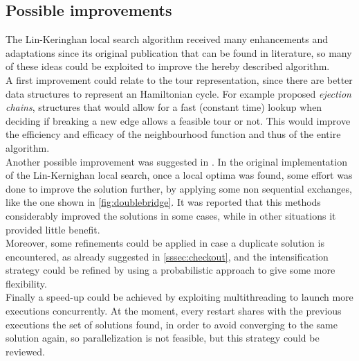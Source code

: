 \subsection{Possible improvements}
The Lin-Keringhan local search algorithm received many enhancements and adaptations since its original publication that can be found in literature, so many of these ideas could be exploited to improve the hereby described algorithm.\\
A first improvement could relate to the tour representation, since there are better data structures to represent an Hamiltonian cycle. For example \cite{GLOVER1996223} proposed \textit{ejection chains}, structures that would allow for a fast (constant time) lookup when deciding if breaking a new edge allows a feasible tour or not. This would improve the efficiency and efficacy of the neighbourhood function and thus of the entire algorithm. \\
Another possible improvement was suggested in \cite{LinK73}. In the original implementation of the Lin-Kernighan local search, once a local optima was found, some effort was done to improve the solution further, by applying some non sequential exchanges, like the one shown in \cref{fig:doublebridge}. It was reported that this methods considerably improved the solutions in some cases, while in other situations it provided little benefit.\\
Moreover, some refinements could be applied in case a duplicate solution is encountered, as already suggested in \cref{sssec:checkout}, and the intensification strategy could be refined by using a probabilistic approach to give some more flexibility.\\
Finally a speed-up could be achieved by exploiting multithreading to launch more executions concurrently. At the moment, every restart shares with the previous executions the set of solutions found, in order to avoid converging to the same solution again, so parallelization is not feasible, but this strategy could be reviewed.\\



